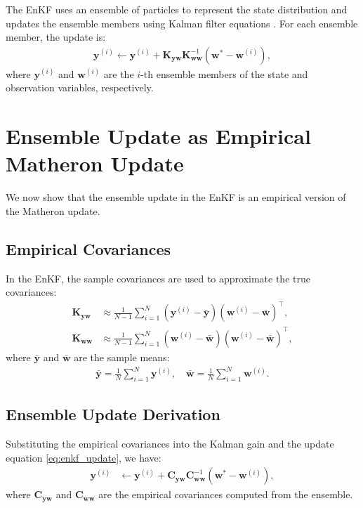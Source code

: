 \documentclass{article}
\theoremstyle{plain}
\begin{document}
The EnKF uses an ensemble of particles to represent the state distribution and updates the ensemble members using Kalman filter equations \cite{EvensenData2009}. For each ensemble member, the update is:
\begin{align}
\mathbf{y}^{(i)} \leftarrow \mathbf{y}^{(i)} + \mathbf{K}_{\mathbf{y}\mathbf{w}} \mathbf{K}_{\mathbf{w}\mathbf{w}}^{-1} (\mathbf{w}^\ast - \mathbf{w}^{(i)}), \label{eq:enkf_update}
\end{align}
where $\mathbf{y}^{(i)}$ and $\mathbf{w}^{(i)}$ are the $i$-th ensemble members of the state and observation variables, respectively.

\section{Ensemble Update as Empirical Matheron Update}

We now show that the ensemble update in the EnKF is an empirical version of the Matheron update.

\subsection{Empirical Covariances}

In the EnKF, the sample covariances are used to approximate the true covariances:
\begin{align}
\mathbf{K}_{\mathbf{y}\mathbf{w}} &\approx \frac{1}{N - 1} \sum_{i=1}^N (\mathbf{y}^{(i)} - \bar{\mathbf{y}}) (\mathbf{w}^{(i)} - \bar{\mathbf{w}})^\top, \\
\mathbf{K}_{\mathbf{w}\mathbf{w}} &\approx \frac{1}{N - 1} \sum_{i=1}^N (\mathbf{w}^{(i)} - \bar{\mathbf{w}}) (\mathbf{w}^{(i)} - \bar{\mathbf{w}})^\top,
\end{align}
where $\bar{\mathbf{y}}$ and $\bar{\mathbf{w}}$ are the sample means:
\begin{align}
\bar{\mathbf{y}} = \frac{1}{N} \sum_{i=1}^N \mathbf{y}^{(i)}, \quad \bar{\mathbf{w}} = \frac{1}{N} \sum_{i=1}^N \mathbf{w}^{(i)}.
\end{align}

\subsection{Ensemble Update Derivation}

Substituting the empirical covariances into the Kalman gain and the update equation \eqref{eq:enkf_update}, we have:
\begin{align}
\mathbf{y}^{(i)} &\leftarrow \mathbf{y}^{(i)} + \mathbf{C}_{\mathbf{y}\mathbf{w}} \mathbf{C}_{\mathbf{w}\mathbf{w}}^{-1} (\mathbf{w}^\ast - \mathbf{w}^{(i)}), \label{eq:ensemble_update}
\end{align}
where $\mathbf{C}_{\mathbf{y}\mathbf{w}}$ and $\mathbf{C}_{\mathbf{w}\mathbf{w}}$ are the empirical covariances computed from the ensemble.
\end{document}
